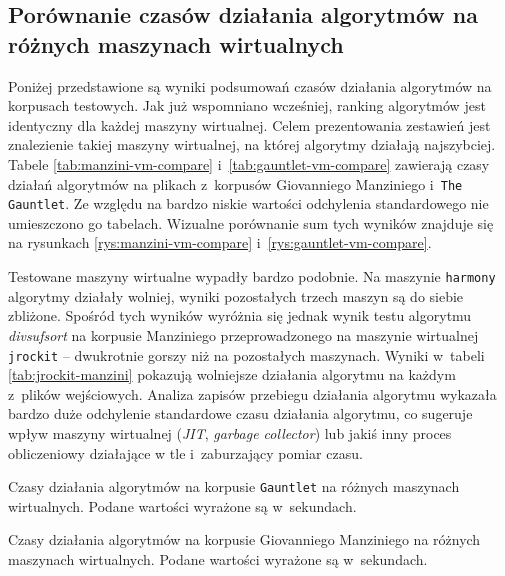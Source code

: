 \FloatBarrier
\subsection{Porównanie czasów działania algorytmów na różnych maszynach wirtualnych}\label{sect:vms}

Poniżej przedstawione są wyniki podsumowań czasów działania algorytmów na korpusach testowych. Jak
już wspomniano wcześniej, ranking algorytmów jest identyczny dla każdej maszyny wirtualnej. Celem
prezentowania zestawień jest znalezienie takiej maszyny wirtualnej, na której algorytmy działają
najszybciej. Tabele \ref{tab:manzini-vm-compare} i~\ref{tab:gauntlet-vm-compare} zawierają czasy
działań algorytmów na plikach z~korpusów Giovanniego Manziniego i~\texttt{The Gauntlet}. Ze względu
na bardzo niskie wartości odchylenia standardowego nie umieszczono go tabelach. Wizualne porównanie
sum tych wyników znajduje się na rysunkach \ref{rys:manzini-vm-compare}
i~\ref{rys:gauntlet-vm-compare}.
	
Testowane maszyny wirtualne wypadły bardzo podobnie. Na maszynie \texttt{harmony} algorytmy działały
wolniej, wyniki pozostałych trzech maszyn są do siebie zbliżone. Spośród tych wyników wyróżnia się
jednak wynik testu algorytmu \emph{divsufsort} na korpusie Manziniego przeprowadzonego na maszynie
wirtualnej \texttt{jrockit} -- dwukrotnie gorszy niż na pozostałych maszynach. Wyniki w~tabeli
\ref{tab:jrockit-manzini} pokazują wolniejsze działania algorytmu na każdym z~plików wejściowych.
Analiza zapisów przebiegu działania algorytmu wykazała bardzo duże odchylenie standardowe czasu
działania algorytmu, co sugeruje wpływ maszyny wirtualnej (\emph{JIT}, \emph{garbage
collector}) lub jakiś inny proces obliczeniowy działające w tle i~zaburzający pomiar czasu.

\begin{table}[ht]
    \begin{center}        
         
    \end{center}                         
    \caption{Czasy działania algorytmów na korpusie \texttt{Gauntlet} na różnych maszynach wirtualnych. Podane wartości wyrażone są w~sekundach.}
    \label{tab:gauntlet-vm-compare}
\end{table}

\begin{table}[ht]
    \begin{center}        
         
    \end{center}                         
    \caption{Czasy działania algorytmów na korpusie Giovanniego Manziniego na różnych maszynach wirtualnych. Podane wartości wyrażone są w~sekundach.}
    \label{tab:manzini-vm-compare}
\end{table}

